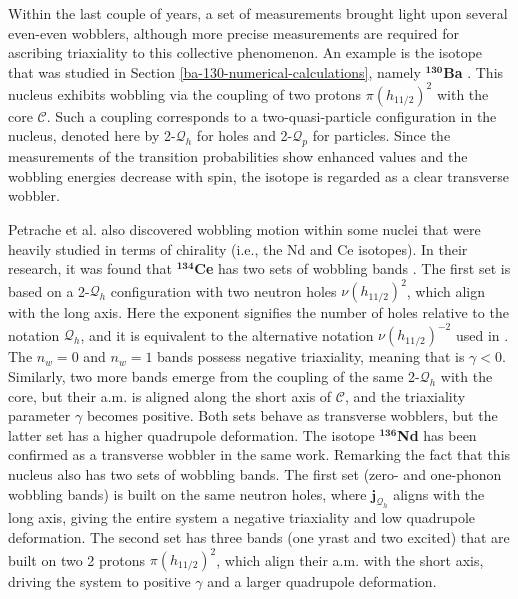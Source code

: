 Within the last couple of years, a set of measurements brought light upon several even-even wobblers, although more precise measurements are required for ascribing triaxiality to this collective phenomenon. An example is the isotope that was studied in Section \ref{ba-130-numerical-calculations}, namely $^\mathbf{130}$\textbf{Ba} \cite{petrache2019diversity,chen2019transverse,wang2020two}. This nucleus exhibits wobbling via the coupling of two protons $\pi (h_{11/2})^2$ with the core $\mathscr{C}$. Such a coupling corresponds to a two-quasi-particle configuration in the nucleus, denoted here by 2-$\mathcal{Q}_h$ for holes and 2-$\mathcal{Q}_p$ for particles. Since the measurements of the transition probabilities show enhanced values and the wobbling energies decrease with spin, the isotope is regarded as a clear transverse wobbler. 

Petrache et al. also discovered wobbling motion within some nuclei that were heavily studied in terms of chirality (i.e., the Nd and Ce isotopes). In their research, it was found that $^\mathbf{134}$\textbf{Ce} has two sets of wobbling bands \cite{petrache2016transverse}. The first set is based on a 2-$\mathcal{Q}_h$ configuration with two neutron holes $\nu (h_{11/2})^2$, which align with the long axis. Here the exponent signifies the number of holes relative to the notation $\mathcal{Q}_h$, and it is equivalent to the alternative notation $\nu(h_{11/2})^{-2}$ used in \cite{petrache2012tilted,lv2018evolution,chen2021microscopic}. The $n_w=0$ and $n_w=1$ bands possess negative triaxiality, meaning that is $\gamma<0$. Similarly, two more bands emerge from the coupling of the same 2-$\mathcal{Q}_h$ with the core, but their a.m. is aligned along the short axis of $\mathscr{C}$, and the triaxiality parameter $\gamma$ becomes positive. Both sets behave as transverse wobblers, but the latter set has a higher quadrupole deformation. The isotope $\mathbf{^{136}}$\textbf{Nd} has been confirmed as a transverse wobbler in the same work. Remarking the fact that this nucleus also has two sets of wobbling bands. The first set (zero- and one-phonon wobbling bands) is built on the same neutron holes, where $\mathbf{j}_{\mathcal{Q}_h}$ aligns with the long axis, giving the entire system a negative triaxiality and low quadrupole deformation. The second set has three bands (one yrast and two excited) that are built on two 2 protons $\pi(h_{11/2})^2$, which align their a.m. with the short axis, driving the system to positive $\gamma$ and a larger quadrupole deformation.

